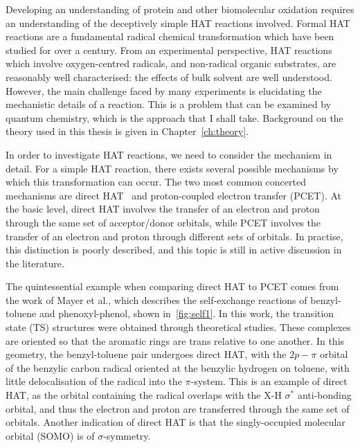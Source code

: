 Developing an understanding of protein and other biomolecular oxidation requires an understanding of the deceptively simple HAT reactions involved. Formal HAT reactions are a fundamental radical chemical transformation which have been studied for over a century.\cite{Kochi1973, Parsons2000} From an experimental perspective, HAT reactions which involve oxygen-centred radicals, and non-radical organic substrates, are reasonably well characterised: the effects of bulk solvent are well understood.\cite{Litwinienko2007} However, the main challenge faced by many experiments is elucidating the mechanistic details of a reaction. This is a problem that can be examined by quantum chemistry, which is the approach that I shall take. Background on the theory used in this thesis is given in Chapter~\ref{ch:theory}.

In order to investigate HAT reactions, we need to consider the mechanism in detail. For a simple HAT reaction, there exists several possible mechanisms by which this transformation can occur. The two most common concerted mechanisms are direct HAT\footnotemark~ and proton-coupled electron transfer (PCET). At the basic level, direct HAT involves the transfer of an electron and proton through the same set of acceptor/donor orbitals, while PCET involves the transfer of an electron and proton through different sets of orbitals. In practise, this distinction is poorly described, and this topic is still in active discussion in the literature.\cite{Cukier1998, Mayer2002, Stubbe2003, Mayer2004, DiLabio2007, Huynh2007, HammesSchiffer2008, Mayer2010, Weinberg2012, HammesSchiffer2015, MunozRugeles2017}


The quintessential example when comparing direct HAT to PCET comes from the work of Mayer et al.,\cite{Mayer2002} which describes the self-exchange reactions of benzyl-toluene and phenoxyl-phenol, shown in~\ref{fig:self1}. In this work, the transition state (TS) structures were obtained through theoretical studies. These complexes are oriented so that the aromatic rings are trans relative to one another. In this geometry, the benzyl-toluene pair undergoes direct HAT, with the $2p-\pi$ orbital of the benzylic carbon radical oriented at the benzylic hydrogen on toluene, with little delocalisation of the radical into the $\pi$-system. This is an example of direct HAT, as the orbital containing the radical overlaps with the X-H $\sigma^*$ anti-bonding orbital, and thus the electron and proton are transferred through the same set of orbitals. Another indication of direct HAT is that the singly-occupied molecular orbital (SOMO) is of $\sigma$-symmetry.

